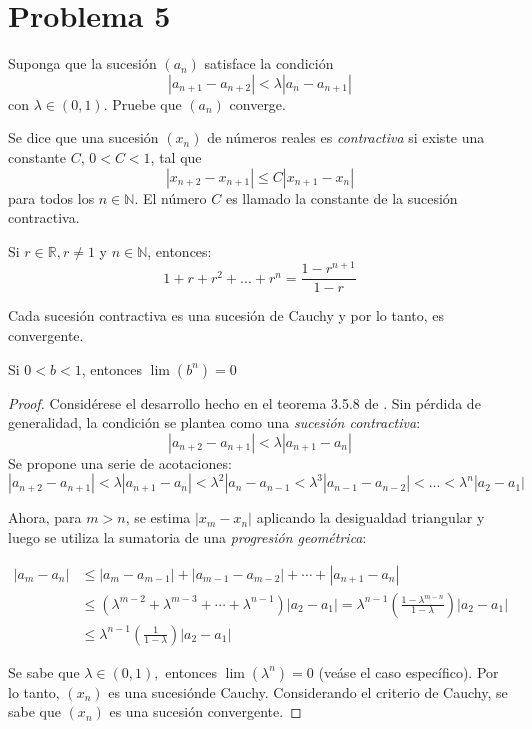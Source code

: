 \documentclass[a4paper,12pt]{article}
\begin{document}
\section{Problema 5} Suponga que la sucesión $\left(a_{n}\right)$ satisface la condición
$$
\left|a_{n+1}-a_{n+2}\right|<\lambda\left|a_{n}-a_{n+1}\right|
$$
con $\lambda \in(0,1) .$ Pruebe que $\left(a_{n}\right)$ converge.
\begin{tcolorbox}[colback=blue!15,colframe=red!1!blue,title=Definición (Sucesión contractiva)]
Se dice que una sucesión $(x_n)$ de números reales es \textit{contractiva} si existe una constante $C$, $0<C<1$, tal que $$|x_{n+2}-x_{n+1}|\leq C|x_{n+1}-x_n|$$ para todos los $n\in\mathbb{N}$. El número $C$ es llamado la constante de la sucesión contractiva.
\end{tcolorbox}
\begin{tcolorbox}[colback=blue!15,colframe=red!1!blue,title=Definición (sumatoria de una progresión geométrica)]
Si $r\in\mathbb{R}, r\neq 1$ y $n\in\mathbb{N}$, entonces:
$$1+r+r^2+...+r^n=\frac{1-r^{n+1}}{1-r}$$
\end{tcolorbox}
\begin{tcolorbox}[colback=gray!15,colframe=gray!1!gray,title=Teorema]
Cada sucesión contractiva es una sucesión de Cauchy y por lo tanto, es convergente.
\end{tcolorbox}
\begin{tcolorbox}[colback=red!15,colframe=gray!1!red,title=Caso específico]
Si $0<b<1$, entonces $\lim (b^n)=0$
\end{tcolorbox}
\begin{proof}
Considérese el desarrollo hecho en el teorema 3.5.8 de \cite{bartle2000introduction}. Sin pérdida de generalidad, la condición se plantea como una \textit{sucesión contractiva}: $$|a_{n+2}-a_{n+1}|<\lambda|a_{n+1}-a_{n}|$$
Se propone una serie de acotaciones: 
$$|a_{n+2}-a_{n+1}|<\lambda|a_{n+1}-a_{n}|<\lambda^2|a_n-a_{n-1}<\lambda^3|a_{n-1}-a_{n-2}|<...<\lambda^n|a_2-a_1|$$

Ahora, para $m>n$, se estima $\left|x_{m}-x_{n}\right|$ aplicando la desigualdad triangular y luego se utiliza la sumatoria de una \textit{progresión geométrica}: 

\begin{align}
\left|a_{m}-a_{n}\right| & \leq\left|a_{m}-a_{m-1}\right|+\left|a_{m-1}-a_{m-2}\right|+\cdots+\left|a_{n+1}-a_{n}\right| \\
& \leq\left(\lambda^{m-2}+\lambda^{m-3}+\cdots+\lambda^{n-1}\right)\left|a_{2}-a_{1}\right| =\lambda^{n-1}\left(\frac{1-\lambda^{m-n}}{1-\lambda}\right)\left|a_{2}-a_{1}\right| \\
& \leq \lambda^{n-1}\left(\frac{1}{1-\lambda}\right)\left|a_{2}-a_{1}\right|
\end{align}

Se sabe que $\lambda\in(0,1),$ entonces $\lim \left(\lambda^{n}\right)=0$ (veáse el caso específico). Por lo tanto, $\left(x_{n}\right)$ es una sucesiónde Cauchy. Considerando el criterio de Cauchy, se sabe que $\left(x_{n}\right)$ es una sucesión convergente.
\end{proof}


\end{document}
